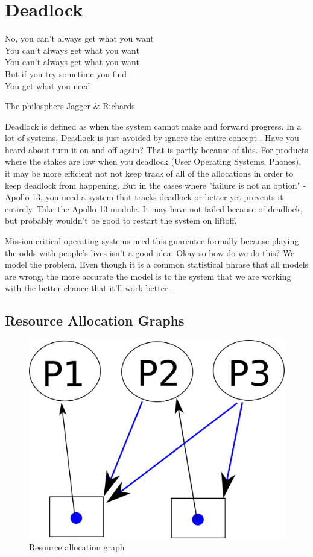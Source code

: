 \chapter{Deadlock}

\epigraph{No, you can't always get what you want
\\You can't always get what you want
\\You can't always get what you want
\\But if you try sometime you find
\\You get what you need}{The philosphers Jagger \& Richards}

\gls{Deadlock} is defined as when the system cannot make and forward progress. In a lot of systems, Deadlock is just avoided by ignore the entire concept \cite[P.237]{silberschatz2006operating}. Have you heard about turn it on and off again? That is partly because of this. For products where the stakes are low when you deadlock (User Operating Systems, Phones), it may be more efficient not not keep track of all of the allocations in order to keep deadlock from happening. But in the cases where "failure is not an option" - Apollo 13, you need a system that tracks deadlock or better yet prevents it entirely. Take the Apollo 13 module. It may have not failed because of deadlock, but probably wouldn't be good to restart the system on liftoff.

Mission critical operating systems need this guarentee formally because playing the odds with people's lives isn't a good idea. Okay so how do we do this? We model the problem. Even though it is a common statistical phrase that all models are wrong, the more accurate the model is to the system that we are working with the better chance that it'll work better.

\section{Resource Allocation Graphs}

\begin{figure}
  \begin{center}
\includegraphics[width=.25\textwidth]{deadlock/images/resource_allocation.png}
\end{center}
  \caption{Resource allocation graph}
\end{figure}

